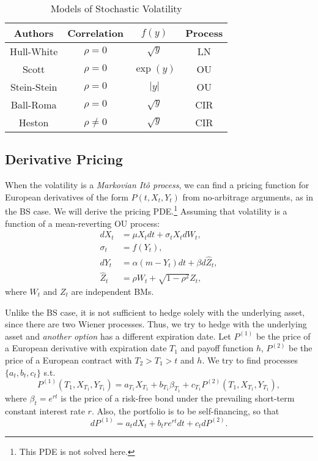 \documentclass[a4paper,12pt]{article}
\numberwithin{equation}{section}
\theoremstyle{definition}
\theoremstyle{remark}
\begin{document}
\begin{table}[h]
    \centering
    \caption{Models of Stochastic Volatility}
    \begin{tabular}{cccc}
        \hline\hline
        Authors & Correlation & $f(y)$ & Process \\
        \hline
        Hull-White & $\rho=0$ & $\sqrt{y}$ & LN \\
        Scott & $\rho=0$ & $\exp(y)$ & OU \\
        Stein-Stein & $\rho=0$ & $|y|$ & OU \\
        Ball-Roma & $\rho=0$ & $\sqrt{y}$ & CIR \\
        Heston & $\rho\neq 0$ & $\sqrt{y}$ & CIR \\
        \hline\hline
    \end{tabular}
    \label{tab:sv_models}
\end{table}

\subsection{Derivative Pricing}\label{sec:sv_BS}
When the volatility is a \textit{Markovian It\^o process}, we can 
find a pricing function for European derivatives of the form 
$P(t,X_{t},Y_{t})$ from no-arbitrage arguments, as in the BS case. 
We will derive the pricing PDE.\footnote{This PDE is not solved here.} 
Assuming that volatility is a function of a mean-reverting OU 
process: 
\begin{equation}\label{eq:SV_SDE_0}
    \begin{split}
        dX_{t}&=\mu X_{t}dt+\sigma_{t} X_{t}dW_{t}, \\
        \sigma_{t}&=f(Y_{t}), \\
        dY_{t}&=\alpha(m-Y_{t})dt+\beta d\hat{Z}_{t}, \\
        \hat{Z}_{t}&=\rho W_{t}+\sqrt{1-\rho^{2}}Z_{t},
    \end{split}
\end{equation}
where $W_{t}$ and $Z_{t}$ are independent BMs.

Unlike the BS case, it is not sufficient to hedge solely with the 
underlying asset, since there are two Wiener processes. Thus, we 
try to hedge with the underlying asset and \textit{another option} 
has a different expiration date. Let $P^{(1)}$ be the price of a 
European derivative with expiration date $T_1$ and payoff function 
$h$, $P^{(2)}$ be the price of a European contract with 
$T_{2}>T_{1}>t$ and $h$. We try to find processes 
$\{a_{t},b_{t},c_{t}\}$ s.t. 
\begin{equation}
\label{eq:hedging_eq_sv_0}
    P^{(1)}(T_{1},X_{T_{1}},Y_{T_{1}})=a_{T_{1}}X_{T_{1}}
    +b_{T_{1}}\beta_{T_{1}}+c_{T_{1}}P^{(2)}(T_{1},X_{T_{1}},Y_{T_{1}}),
\end{equation}
where $\beta_{t}=e^{rt}$ is the price of a risk-free bond under 
the prevailing short-term constant interest rate $r$. Also, the 
portfolio is to be self-financing, so that 
\begin{equation}
\label{eq:self_financing_sv}
    dP^{(1)}=a_{t}dX_{t}+b_{t}re^{rt}dt+c_{t}dP^{(2)}.
\end{equation}
\end{document}
